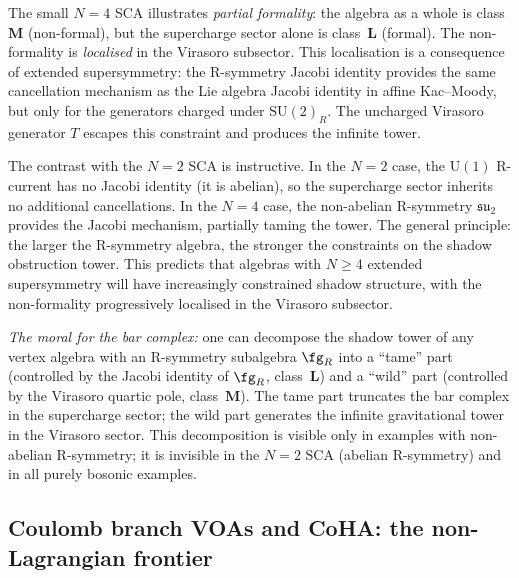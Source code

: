\begin{remark}
\label{rem:N4-partial-formality}
The small $N{=}4$ SCA illustrates
\emph{partial formality}: the algebra as a whole is
class~$\mathbf{M}$ (non-formal), but the supercharge sector
alone is class~$\mathbf{L}$ (formal). The non-formality is
\emph{localised} in the Virasoro subsector. This localisation is a
consequence of extended supersymmetry: the R-symmetry Jacobi
identity provides the same cancellation mechanism as the Lie algebra
Jacobi identity in affine Kac--Moody, but only for the generators
charged under $\mathrm{SU}(2)_R$. The uncharged Virasoro generator
$T$ escapes this constraint and produces the infinite tower.

The contrast with the $N{=}2$ SCA is instructive. In the $N{=}2$
case, the $\mathrm{U}(1)$ R-current has no Jacobi identity (it is
abelian), so the supercharge sector inherits no additional
cancellations. In the $N{=}4$ case, the non-abelian R-symmetry
$\mathfrak{su}_2$ provides the Jacobi mechanism, partially taming
the tower. The general principle: the larger the R-symmetry
algebra, the stronger the constraints on the shadow obstruction tower.
This predicts that algebras with $N \ge 4$ extended supersymmetry
will have increasingly constrained shadow structure, with the
non-formality progressively localised in the Virasoro subsector.

\emph{The moral for the bar complex:} one can decompose the shadow
tower of any vertex algebra with an R-symmetry subalgebra
$\fg_R$ into a ``tame'' part (controlled by the Jacobi identity
of $\fg_R$, class~$\mathbf{L}$) and a ``wild'' part (controlled
by the Virasoro quartic pole, class~$\mathbf{M}$). The tame
part truncates the bar complex in the supercharge sector;
the wild part generates the infinite gravitational tower in
the Virasoro sector. This decomposition is
visible only in examples with non-abelian R-symmetry;
it is invisible in the $N{=}2$ SCA (abelian R-symmetry)
and in all purely bosonic examples.
\end{remark}


%
%

\subsection{Coulomb branch VOAs and CoHA: the non-Lagrangian frontier}
\label{subsec:coulomb-coha}

